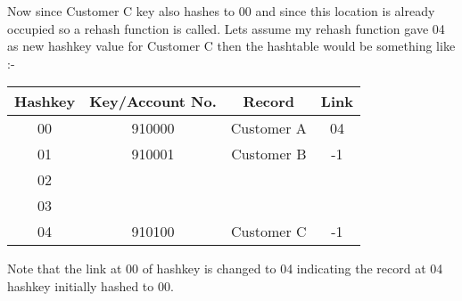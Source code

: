 \documentclass[12pt,a4paper]{article}
\begin{document}
\noindent Now since Customer C key also hashes to 00 and since this location is already occupied so a rehash function is called. Lets assume my rehash function gave 04 as new hashkey value for Customer C then the hashtable would be something like :-

\FloatBarrier
\begin{table}[H]

	\centering	
	\begin{tabular}{|c|c|c|c|} %

	\hline
	\textbf{Hashkey} & \textbf{Key/Account No.} & \textbf{Record} & \textbf{Link} \\

	\hline
	
	00 & 910000 & Customer A & 04 \\
	01 & 910001 & Customer B & -1 \\
	02 & & & \\
	03 & & & \\
	04 & 910100 & Customer C & -1 \\

	\hline
	\end{tabular}

\end{table}
\FloatBarrier

\noindent Note that the link at 00 of hashkey is changed to 04 indicating the record at 04 hashkey initially hashed to 00.
\end{document}
